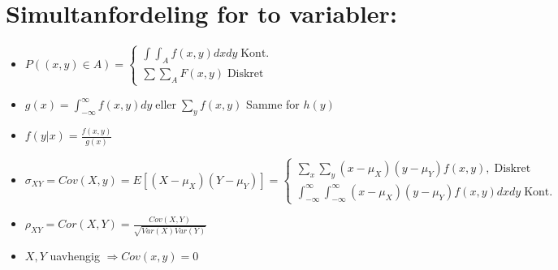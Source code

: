 \documentclass[8pt,a4paper,twocolumn,twoside]{article}
\begin{document}
\section*{Simultanfordeling for to variabler:}
\begin{itemize}[topsep=0pt,itemsep=0pt, partopsep=0pt]
    \item $P((x,y)\in A)=\begin{cases}
        \int\int_A f(x,y)dxdy\;\text{Kont.}\\
        \sum\sum_A F(x,y)\;\text{Diskret}
    \end{cases}$
    \item $g(x)=\int_{-\infty}^\infty f(x,y)dy\;\text{eller}\;\sum_yf(x,y)$ Samme for $h(y)$
    \item $f(y|x)=\frac{f(x,y)}{g(x)}$
    \item $\sigma_{XY}=Cov(X,y)=E[(X-\mu_X)(Y-\mu_Y)]=\begin{cases}
        \sum_x\sum_y(x-\mu_X)(y-\mu_Y)f(x,y),\;\text{Diskret}\\
        \int_{-\infty}^\infty\int_{-\infty}^\infty (x-\mu_X)(y-\mu_Y)f(x,y)dxdy\;\text{Kont.}
    \end{cases}$
    \item $\rho_{XY}=Cor(X,Y)=\frac{Cov(X,Y)}{\sqrt{Var(X)Var(Y)}}$
    \item $X,Y$ uavhengig $\Rightarrow Cov(x,y)=0$
\end{itemize}
\end{document}
